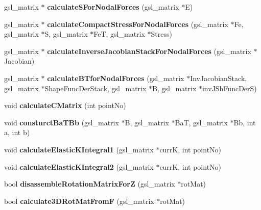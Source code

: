 \begin{DoxyCompactItemize}
\item 
\hypertarget{classShapeBase_ae935864e71abacdb3181d441826bbd39}{}gsl\+\_\+matrix $\ast$ {\bfseries calculate\+S\+For\+Nodal\+Forces} (gsl\+\_\+matrix $\ast$E)\label{classShapeBase_ae935864e71abacdb3181d441826bbd39}

\item 
\hypertarget{classShapeBase_a27269b78017539874f7be9e20973c086}{}gsl\+\_\+matrix $\ast$ {\bfseries calculate\+Compact\+Stress\+For\+Nodal\+Forces} (gsl\+\_\+matrix $\ast$Fe, gsl\+\_\+matrix $\ast$S, gsl\+\_\+matrix $\ast$Fe\+T, gsl\+\_\+matrix $\ast$Stress)\label{classShapeBase_a27269b78017539874f7be9e20973c086}

\item 
\hypertarget{classShapeBase_ac9eaa594e8955de91b2f4b0368c85bae}{}gsl\+\_\+matrix $\ast$ {\bfseries calculate\+Inverse\+Jacobian\+Stack\+For\+Nodal\+Forces} (gsl\+\_\+matrix $\ast$Jacobian)\label{classShapeBase_ac9eaa594e8955de91b2f4b0368c85bae}

\item 
\hypertarget{classShapeBase_ad67919694a1d780e31f6d539781377be}{}gsl\+\_\+matrix $\ast$ {\bfseries calculate\+B\+Tfor\+Nodal\+Forces} (gsl\+\_\+matrix $\ast$Inv\+Jacobian\+Stack, gsl\+\_\+matrix $\ast$Shape\+Func\+Der\+Stack, gsl\+\_\+matrix $\ast$B, gsl\+\_\+matrix $\ast$inv\+J\+Sh\+Func\+Der\+S)\label{classShapeBase_ad67919694a1d780e31f6d539781377be}

\item 
\hypertarget{classShapeBase_ab9e027b7bb9553a0850875c5b94ed4a5}{}void {\bfseries calculate\+C\+Matrix} (int point\+No)\label{classShapeBase_ab9e027b7bb9553a0850875c5b94ed4a5}

\item 
\hypertarget{classShapeBase_a7ae9fb15fa6e3f99173841ea910710c1}{}void {\bfseries consturct\+Ba\+T\+Bb} (gsl\+\_\+matrix $\ast$B, gsl\+\_\+matrix $\ast$Ba\+T, gsl\+\_\+matrix $\ast$Bb, int a, int b)\label{classShapeBase_a7ae9fb15fa6e3f99173841ea910710c1}

\item 
\hypertarget{classShapeBase_af7556d90ad8fe05eb78a5c2967b75f53}{}void {\bfseries calculate\+Elastic\+K\+Integral1} (gsl\+\_\+matrix $\ast$curr\+K, int point\+No)\label{classShapeBase_af7556d90ad8fe05eb78a5c2967b75f53}

\item 
\hypertarget{classShapeBase_a2011f33d1b4fd848d46d9faad66e1b7e}{}void {\bfseries calculate\+Elastic\+K\+Integral2} (gsl\+\_\+matrix $\ast$curr\+K, int point\+No)\label{classShapeBase_a2011f33d1b4fd848d46d9faad66e1b7e}

\item 
\hypertarget{classShapeBase_a91a660608ede71c5bfdd1c4956843760}{}bool {\bfseries disassemble\+Rotation\+Matrix\+For\+Z} (gsl\+\_\+matrix $\ast$rot\+Mat)\label{classShapeBase_a91a660608ede71c5bfdd1c4956843760}

\item 
\hypertarget{classShapeBase_a9b249ac3da27e7eeb6e0604a76f15faf}{}bool {\bfseries calculate3\+D\+Rot\+Mat\+From\+F} (gsl\+\_\+matrix $\ast$rot\+Mat)\label{classShapeBase_a9b249ac3da27e7eeb6e0604a76f15faf}

\end{DoxyCompactItemize}
